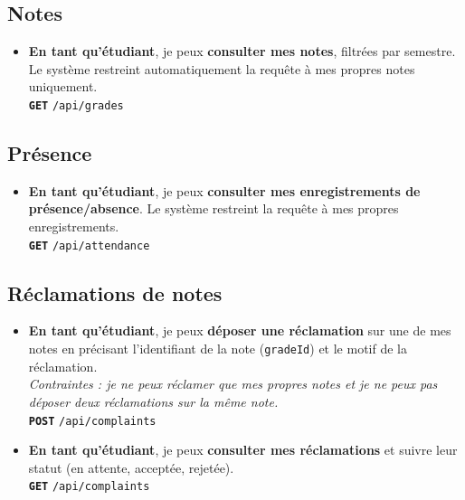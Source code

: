 \documentclass[12pt,a4paper]{article}
\newcommand{\route}[1]{\texorpdfstring{\texttt{\small\color{routeGray}#1}}{#1}}
\newcommand{\httpmethod}[1]{%
  \ifstrequal{#1}{GET}{\colorbox{blue!15}{\texttt{\bfseries\color{blue!70!black}GET}}}{}%
  \ifstrequal{#1}{POST}{\colorbox{green!18}{\texttt{\bfseries\color{green!60!black}POST}}}{}%
  \ifstrequal{#1}{PUT}{\colorbox{orange!18}{\texttt{\bfseries\color{orange!70!black}PUT}}}{}%
  \ifstrequal{#1}{DELETE}{\colorbox{red!15}{\texttt{\bfseries\color{red!70!black}DELETE}}}{}%
}
\newcommand{\usmark}{\color{accentGold}$\blacktriangleright$\;}
\begin{document}
\begin{studentbox}
\subsection*{Notes}

\begin{itemize}[leftmargin=1.2cm, labelsep=0.4cm]
  \item[\usmark] \textbf{En tant qu'étudiant}, je peux \textbf{consulter mes notes}, filtrées par semestre. Le système restreint automatiquement la requête à mes propres notes uniquement.\\
    \httpmethod{GET} \route{/api/grades}
\end{itemize}

\subsection*{Présence}

\begin{itemize}[leftmargin=1.2cm, labelsep=0.4cm]
  \item[\usmark] \textbf{En tant qu'étudiant}, je peux \textbf{consulter mes enregistrements de présence/absence}. Le système restreint la requête à mes propres enregistrements.\\
    \httpmethod{GET} \route{/api/attendance}
\end{itemize}

\subsection*{Réclamations de notes}

\begin{itemize}[leftmargin=1.2cm, labelsep=0.4cm]
  \item[\usmark] \textbf{En tant qu'étudiant}, je peux \textbf{déposer une réclamation} sur une de mes notes en précisant l'identifiant de la note (\texttt{gradeId}) et le motif de la réclamation.\\
    \textit{Contraintes : je ne peux réclamer que mes propres notes et je ne peux pas déposer deux réclamations sur la même note.}\\
    \httpmethod{POST} \route{/api/complaints}

  \item[\usmark] \textbf{En tant qu'étudiant}, je peux \textbf{consulter mes réclamations} et suivre leur statut (en attente, acceptée, rejetée).\\
    \httpmethod{GET} \route{/api/complaints}
\end{itemize}


\end{studentbox}
\end{document}
